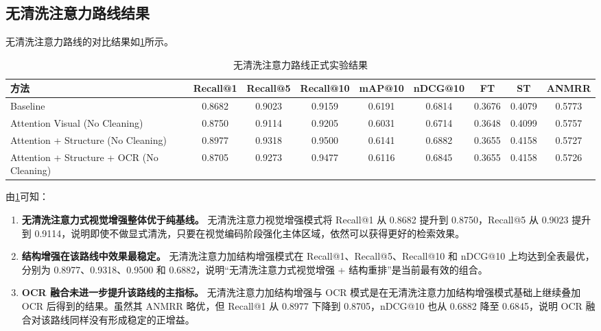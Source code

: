 \subsection{无清洗注意力路线结果}

无清洗注意力路线的对比结果如\cref{tab:attention-route-results}所示。

\begin{table}[htbp]
  \centering
  \caption{无清洗注意力路线正式实验结果}
  \label{tab:attention-route-results}
  \begin{adjustbox}{width=\textwidth}
    \small
    \setlength{\tabcolsep}{3.8pt}
    \begin{tabular}{p{4.8cm}cccccccc}
      \toprule
      方法 & Recall@1 & Recall@5 & Recall@10 & mAP@10 & nDCG@10 & FT & ST & ANMRR \\
      \midrule
      Baseline & 0.8682 & 0.9023 & 0.9159 & 0.6191 & 0.6814 & 0.3676 & 0.4079 & 0.5773 \\
      Attention Visual (No Cleaning) & 0.8750 & 0.9114 & 0.9205 & 0.6031 & 0.6714 & 0.3648 & 0.4099 & 0.5757 \\
      Attention + Structure (No Cleaning) & 0.8977 & 0.9318 & 0.9500 & 0.6141 & 0.6882 & 0.3655 & 0.4158 & 0.5727 \\
      Attention + Structure + OCR (No Cleaning) & 0.8705 & 0.9273 & 0.9477 & 0.6116 & 0.6845 & 0.3655 & 0.4158 & 0.5726 \\
      \bottomrule
    \end{tabular}
  \end{adjustbox}
\end{table}

由\cref{tab:attention-route-results}可知：
\begin{enumerate}
  \item \textbf{无清洗注意力式视觉增强整体优于纯基线。} 无清洗注意力视觉增强模式将 Recall@1 从 0.8682 提升到 0.8750，Recall@5 从 0.9023 提升到 0.9114，说明即使不做显式清洗，只要在视觉编码阶段强化主体区域，依然可以获得更好的检索效果。
  \item \textbf{结构增强在该路线中效果最稳定。} 无清洗注意力加结构增强模式在 Recall@1、Recall@5、Recall@10 和 nDCG@10 上均达到全表最优，分别为 0.8977、0.9318、0.9500 和 0.6882，说明“无清洗注意力式视觉增强 + 结构重排”是当前最有效的组合。
  \item \textbf{OCR 融合未进一步提升该路线的主指标。} 无清洗注意力加结构增强与 OCR 模式是在无清洗注意力加结构增强模式基础上继续叠加 OCR 后得到的结果。虽然其 ANMRR 略优，但 Recall@1 从 0.8977 下降到 0.8705，nDCG@10 也从 0.6882 降至 0.6845，说明 OCR 融合对该路线同样没有形成稳定的正增益。
\end{enumerate}

